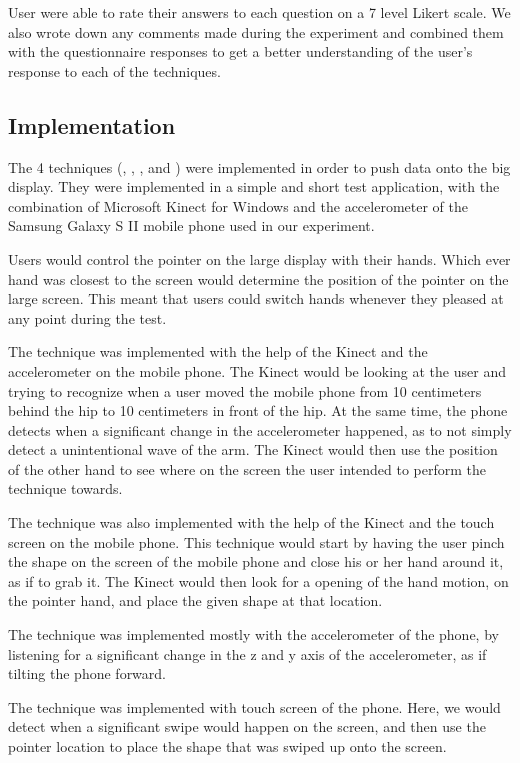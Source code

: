 User were able to rate their answers to each question on a 7 level Likert scale. 
We also wrote down any comments made during the experiment and combined them with the questionnaire responses to get a better understanding of the user’s response to each of the techniques.  

\subsection{Implementation}

The 4 techniques (\swipe, \tilt, \throw, and \pinch) were implemented in order to push data onto the big display. They were implemented in a simple and short test application, with the combination of Microsoft Kinect for Windows and the accelerometer of the Samsung Galaxy S II mobile phone used in our experiment. 

Users would control the pointer on the large display with their hands. 
Which ever hand was closest to the screen would determine the position of the pointer on the large screen. 
This meant that users could switch hands whenever they pleased at any point during the test. 

The \throw technique was implemented with the help of the Kinect and the accelerometer on the mobile phone. 
The Kinect would be looking at the user and trying to recognize when a user moved the mobile phone from 10 centimeters behind the hip to 10 centimeters in front of the hip. 
At the same time, the phone detects when a significant change in the accelerometer happened, as to not simply detect a unintentional wave of the arm. 
The Kinect would then use the position of the other hand to see where on the screen the user intended to perform the \throw technique towards. 

The \pinch technique was also implemented with the help of the Kinect and the touch screen on the mobile phone. 
This technique would start by having the user pinch the shape on the screen of the mobile phone and close his or her hand around it, as if to grab it. 
The Kinect would then look for a opening of the hand motion, on the pointer hand, and place the given shape at that location. 

The \tilt technique was implemented mostly with the accelerometer of the phone, by listening for a significant change in the z and y axis of the accelerometer, as if tilting the phone forward. 

The \swipe technique was implemented with touch screen of the phone. 
Here, we would detect when a significant swipe would happen on the screen, and then use the pointer location to place the shape that was swiped up onto the screen. 

